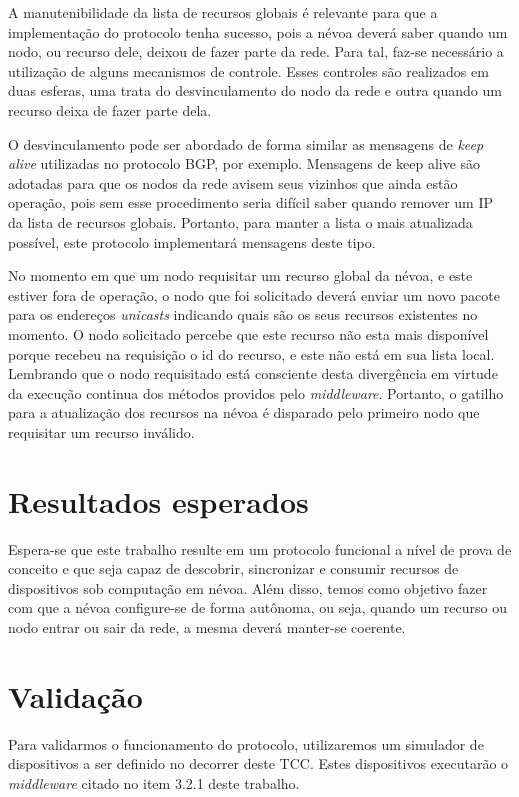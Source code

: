 A manutenibilidade da lista de recursos globais é relevante para que a implementação do protocolo tenha sucesso, pois a névoa deverá saber quando um nodo, ou recurso dele, deixou de fazer parte da rede.
Para tal, faz-se necessário a utilização de alguns mecanismos de controle.
Esses controles são realizados em duas esferas, uma trata do desvinculamento do nodo da rede e outra quando um recurso deixa de fazer parte dela.

O desvinculamento pode ser abordado de forma similar as mensagens de \textit{keep alive} utilizadas no protocolo BGP, por exemplo.
Mensagens de keep alive são adotadas para que os nodos da rede avisem seus vizinhos que ainda estão operação, pois sem esse procedimento seria difícil
saber quando remover um IP da lista de recursos globais. Portanto, para manter a lista o mais atualizada possível, este protocolo implementará mensagens deste tipo.

No momento em que um nodo requisitar um recurso global da névoa, e este estiver fora de operação, o nodo que foi solicitado deverá enviar um novo pacote para os endereços \textit{unicasts} indicando quais são os seus recursos existentes no momento.
O nodo solicitado percebe que este recurso não esta mais disponível porque recebeu na requisição o id do recurso, e este não está em sua lista local.
Lembrando que o nodo requisitado está consciente desta divergência em virtude da execução continua dos métodos providos pelo \textit{middleware}. Portanto, o gatilho para a atualização dos recursos na névoa
é disparado pelo primeiro nodo que requisitar um recurso inválido.


\section{Resultados esperados}

Espera-se que este trabalho resulte em um protocolo funcional a nível de prova de conceito e que seja capaz de descobrir, sincronizar e consumir recursos de dispositivos sob computação em névoa.
Além disso, temos como objetivo fazer com que a névoa configure-se de forma autônoma, ou seja, quando um recurso ou nodo entrar ou sair da rede, a mesma deverá manter-se coerente.


\section{Validação}

Para validarmos o funcionamento do protocolo, utilizaremos um simulador de dispositivos a ser definido no decorrer deste TCC.
Estes dispositivos executarão o \textit{middleware} citado no item 3.2.1 deste trabalho.

